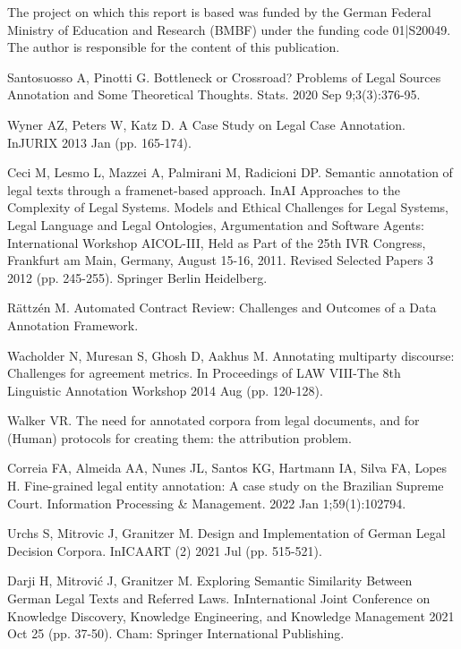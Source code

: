 \documentclass{IOS-Book-Article}
\begin{document}
The project on which this report is based was funded by the German Federal Ministry of Education and Research (BMBF) under the funding code 01|S20049. The author is responsible for the content of this publication.

\begin{thebibliography}{99}

Santosuosso A, Pinotti G. Bottleneck or Crossroad? Problems of Legal Sources Annotation and Some Theoretical Thoughts. Stats. 2020 Sep 9;3(3):376-95.

Wyner AZ, Peters W, Katz D. A Case Study on Legal Case Annotation. InJURIX 2013 Jan (pp. 165-174).

Ceci M, Lesmo L, Mazzei A, Palmirani M, Radicioni DP. Semantic annotation of legal texts through a framenet-based approach. InAI Approaches to the Complexity of Legal Systems. Models and Ethical Challenges for Legal Systems, Legal Language and Legal Ontologies, Argumentation and Software Agents: International Workshop AICOL-III, Held as Part of the 25th IVR Congress, Frankfurt am Main, Germany, August 15-16, 2011. Revised Selected Papers 3 2012 (pp. 245-255). Springer Berlin Heidelberg.

Rättzén M. Automated Contract Review: Challenges and Outcomes of a Data Annotation Framework.

Wacholder N, Muresan S, Ghosh D, Aakhus M. Annotating multiparty discourse: Challenges for agreement metrics. In Proceedings of LAW VIII-The 8th Linguistic Annotation Workshop 2014 Aug (pp. 120-128).

Walker VR. The need for annotated corpora from legal documents, and for (Human) protocols for creating them: the attribution problem.

Correia FA, Almeida AA, Nunes JL, Santos KG, Hartmann IA, Silva FA, Lopes H. Fine-grained legal entity annotation: A case study on the Brazilian Supreme Court. Information Processing \& Management. 2022 Jan 1;59(1):102794.

Urchs S, Mitrovic J, Granitzer M. Design and Implementation of German Legal Decision Corpora. InICAART (2) 2021 Jul (pp. 515-521).

Darji H, Mitrović J, Granitzer M. Exploring Semantic Similarity Between German Legal Texts and Referred Laws. InInternational Joint Conference on Knowledge Discovery, Knowledge Engineering, and Knowledge Management 2021 Oct 25 (pp. 37-50). Cham: Springer International Publishing.


\end{thebibliography}
\end{document}
